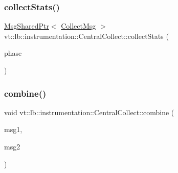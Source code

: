 \mbox{\label{structvt_1_1lb_1_1instrumentation_1_1_central_collect_a7161d3f662ad33336ff3dfacfb141e45}} 
\subsubsection{\texorpdfstring{collect\+Stats()}{collectStats()}}
{\footnotesize\ttfamily \hyperlink{namespacevt_ab2b3d506ec8e8d1540aede826d84a239}{Msg\+Shared\+Ptr}$<$ \hyperlink{structvt_1_1lb_1_1instrumentation_1_1_collect_msg}{Collect\+Msg} $>$ vt\+::lb\+::instrumentation\+::\+Central\+Collect\+::collect\+Stats (\begin{DoxyParamCaption}\item[{\hyperlink{namespacevt_a5505d0bab25ce2ff566a8e015871b379}{L\+B\+Phase\+Type} const \&}]{phase }\end{DoxyParamCaption})\hspace{0.3cm}{\ttfamily [static]}}

\mbox{\label{structvt_1_1lb_1_1instrumentation_1_1_central_collect_a38b6e55982754362cbea1921e044038c}} 
\subsubsection{\texorpdfstring{combine()}{combine()}}
{\footnotesize\ttfamily void vt\+::lb\+::instrumentation\+::\+Central\+Collect\+::combine (\begin{DoxyParamCaption}\item[{\hyperlink{structvt_1_1lb_1_1instrumentation_1_1_collect_msg}{Collect\+Msg} $\ast$}]{msg1,  }\item[{\hyperlink{structvt_1_1lb_1_1instrumentation_1_1_collect_msg}{Collect\+Msg} $\ast$}]{msg2 }\end{DoxyParamCaption})\hspace{0.3cm}{\ttfamily [static]}}

